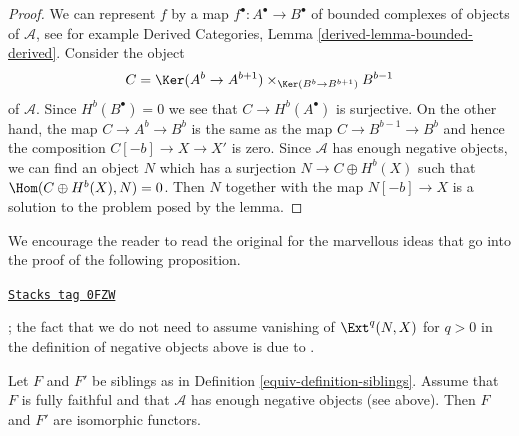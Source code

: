 \begin{proof}
We can represent $f$ by a map $f^\bullet : A^\bullet \to B^\bullet$
of bounded complexes of objects of $\mathcal{A}$, see for example
Derived Categories, Lemma \ref{derived-lemma-bounded-derived}.
Consider the object
$$
C = \Ker(A^b \to A^{b + 1}) \times_{\Ker(B^b \to B^{b + 1})} B^{b - 1}
$$
of $\mathcal{A}$. Since $H^b(B^\bullet) = 0$ we see that
$C \to H^b(A^\bullet)$ is surjective. On the other hand, the map
$C \to A^b \to B^b$ is the same as the map $C \to B^{b - 1} \to B^b$
and hence the composition $C[-b] \to X \to X'$ is zero.
Since $\mathcal{A}$ has enough negative objects, we can find an object $N$
which has a surjection $N \to C \oplus H^b(X)$ such that
$\Hom(C \oplus H^b(X), N) = 0$. Then $N$ together with the map
$N[-b] \to X$ is a solution to the problem posed by the lemma.
\end{proof}

We encourage the reader to read the original
\cite[Proposition 2.16]{Orlov-K3} for the marvellous ideas
that go into the proof of the following proposition.

\begin{proposition}
\label{equiv-proposition-siblings-isomorphic}
\href{https://stacks.math.columbia.edu/tag/0FZW}{\texttt{Stacks tag 0FZW}}

\begin{reference}
\cite[Proposition 2.16]{Orlov-K3}; the fact that we do not need
to assume vanishing of $\Ext^q(N, X)$ for $q > 0$ in the definition
of negative objects above is due to \cite{Canonaco-Stellari}.
\end{reference}
Let $F$ and $F'$ be siblings as in Definition \ref{equiv-definition-siblings}.
Assume that $F$ is fully faithful and that $\mathcal{A}$ has enough
negative objects (see above). Then $F$ and $F'$ are isomorphic functors.
\end{proposition}

